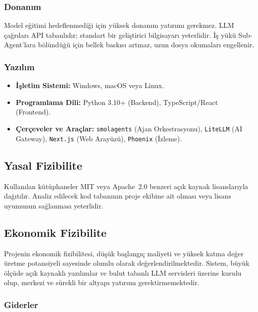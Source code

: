 \subsubsection{Donanım}
\label{sec:donanim-fizibilitesi}
Model eğitimi hedeflenmediği için yüksek donanım yatırımı gerekmez. LLM çağrıları API tabanlıdır; standart bir geliştirici bilgisayarı yeterlidir. İş yükü Sub-Agent'lara bölündüğü için bellek baskısı artmaz, uzun dosya okumaları engellenir.

\subsubsection{Yazılım}
\label{sec:yazilim-fizibilitesi}
\begin{itemize}
    \item \textbf{İşletim Sistemi:} Windows, macOS veya Linux.
    \item \textbf{Programlama Dili:} Python 3.10+ (Backend), TypeScript/React (Frontend).
    \item \textbf{Çerçeveler ve Araçlar:} \texttt{smolagents} (Ajan Orkestrasyonu), \texttt{LiteLLM} (AI Gateway), \texttt{Next.js} (Web Arayüzü), \texttt{Phoenix} (İzleme).
\end{itemize}

\subsection{Yasal Fizibilite}
\label{sec:yasal-fizibilite}
Kullanılan kütüphaneler MIT veya Apache~2.0 benzeri açık kaynak lisanslarıyla dağıtılır. Analiz edilecek kod tabanının proje ekibine ait olması veya lisans uyumunun sağlanması yeterlidir.

\subsection{Ekonomik Fizibilite}
\label{sec:ekonomik-fizibilitesi}

Projenin ekonomik fizibilitesi, düşük başlangıç maliyeti ve yüksek katma değer üretme potansiyeli sayesinde olumlu olarak değerlendirilmektedir. Sistem, büyük ölçüde açık kaynaklı yazılımlar ve bulut tabanlı LLM servisleri üzerine kurulu olup, merkezi ve sürekli bir altyapı yatırımı gerektirmemektedir.

\subsubsection{Giderler}

